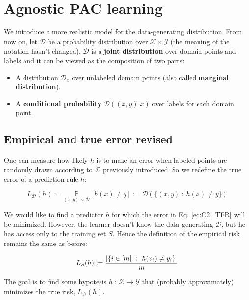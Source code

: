 \documentclass[../../main/main.tex]{subfiles}
\begin{document}
\section{Agnostic PAC learning}
We introduce a more realistic model for the data-generating distribution. From now on, let \( \mathcal{D} \) be a probability distribution over \( \mathcal{X} \times \mathcal{Y} \) (the meaning of the notation hasn't changed). \( \mathcal{D} \) is a \textbf{joint distribution} over domain points and labels and it can be viewed as the composition of two parts:
\begin{itemize}
    \item A distribution \( \mathcal{D}_x \) over unlabeled domain points (also called \textbf{marginal distribution}).
    \item A \textbf{conditional probability} \( \mathcal{D}((x,y)|x) \) over labels for each domain point.
\end{itemize}



\subsection{Empirical and true error revised}
One can measure how likely \( h \) is to make an error when labeled points are randomly drawn according to \( \mathcal{D} \) previously introduced. So we redefine the true error of a prediction rule \( h \):

\begin{equation}
    L_{\mathcal{D}}(h)
    :=
    \underset{(x,y) \sim \mathcal{D}}{\mathbb{P}}[h(x) \neq y]
    :=
    \mathcal{D}(\{ (x,y) \ : \ h(x) \neq y \})
    \label{eq:C2_TER}
\end{equation}

We would like to find a predictor \( h \) for which the error in Eq. \ref{eq:C2_TER} will be minimized. However, the learner doesn't know the data generating \( \mathcal{D} \), but he has access only to the training set \( S \). Hence the definition of the empirical risk remains the same as before:

\begin{equation}
    L_S (h)
    :=
    \frac{\abs{\{ i \in [m] \ : \ h(x_i) \neq y_i \}} }{m}
    \label{eq:C2_ER}
\end{equation}

The goal is to find some hypotesis \( h \ : \ \mathcal{X} \to \mathcal{Y} \) that (probably approximately) minimizes the true risk, \( L_{\mathcal{D}}(h) \).
\end{document}
